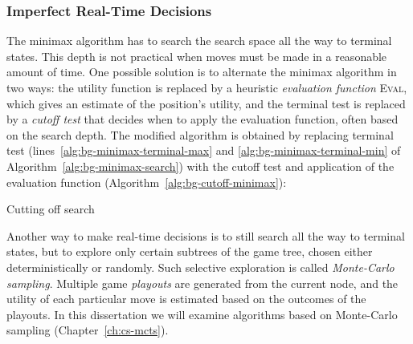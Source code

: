 \subsubsection{Imperfect Real-Time Decisions}

The minimax algorithm has to search the search space all the way
to terminal states. This depth is not practical when moves must be
made in a reasonable amount of time. One possible solution is to
alternate the minimax algorithm in two ways: the utility function is
replaced by a heuristic {\em evaluation function} \textsc{Eval}, which gives an
estimate of the position's utility, and the terminal test is replaced
by a {\em cutoff test} that decides when to apply the evaluation
function, often based on the search depth.  The modified algorithm is
obtained by replacing terminal test (lines~\ref{alg:bg-minimax-terminal-max} 
and \ref{alg:bg-minimax-terminal-min} of Algorithm~\ref{alg:bg-minimax-search})
with the cutoff test and application of the evaluation function
(Algorithm~\ref{alg:bg-cutoff-minimax}): 
\begin{algorithm}
\caption{Cutting off search}
\label{alg:bg-cutoff-minimax}
\begin{algorithmic}[1]
     \State \Return {}
  \EndIf
\end{algorithmic}
\end{algorithm}

Another way to make real-time decisions is to still search all the
way to terminal states, but to explore only certain
subtrees of the game tree, chosen either deterministically or
randomly. Such selective exploration is called {\em Monte-Carlo
  sampling}. Multiple game {\em playouts} are generated from the
current node, and the utility of each particular move is estimated
based on the outcomes of the playouts. In this dissertation we will
examine algorithms based on Monte-Carlo sampling (Chapter~\ref{ch:cs-mcts}).
